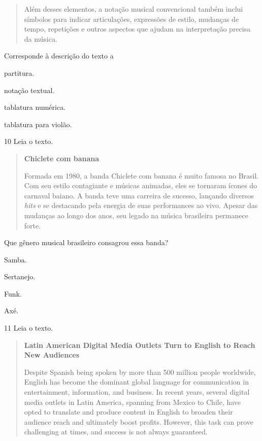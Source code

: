 \begin{quote}
Além desses elementos, a notação musical convencional também inclui símbolos para indicar articulações, expressões de estilo, mudanças de tempo, repetições e outros aspectos que ajudam na interpretação precisa da música.

\end{quote}

Corresponde à descrição do texto a

\begin{escolha}
\item partitura.
\item notação textual.
\item tablatura numérica.
\item tablatura para violão.
\end{escolha}


\num{10} Leia o texto.

\begin{quote}
\textbf{Chiclete com banana}

Formada em 1980, a banda Chiclete com banana é muito famosa no Brasil. Com seu estilo contagiante e músicas 
animadas, eles se tornaram ícones do carnaval baiano. A banda teve uma carreira de sucesso, lançando 
diversos \textit{hits} e se destacando pela energia de suas performances ao vivo. Apesar das mudanças ao 
longo dos anos, seu legado na música brasileira permanece forte.

\end{quote}

Que gênero musical brasileiro consagrou essa banda?

\begin{escolha}
\item
  Samba.
\item
  Sertanejo.
\item
  Funk.
\item
  Axé.
\end{escolha}

\pagebreak
\num{11} Leia o texto.

\begin{quote}
\textbf{Latin American Digital Media Outlets Turn to English to Reach New Audiences}

Despite Spanish being spoken by more than 500 million people worldwide,
English has become the dominant global language for communication in
entertainment, information, and business. In recent years, several
digital media outlets in Latin America, spanning from Mexico to Chile,
have opted to translate and produce content in English to broaden their
audience reach and ultimately boost profits. However, this task can
prove challenging at times, and success is not always guaranteed.

\end{quote}


